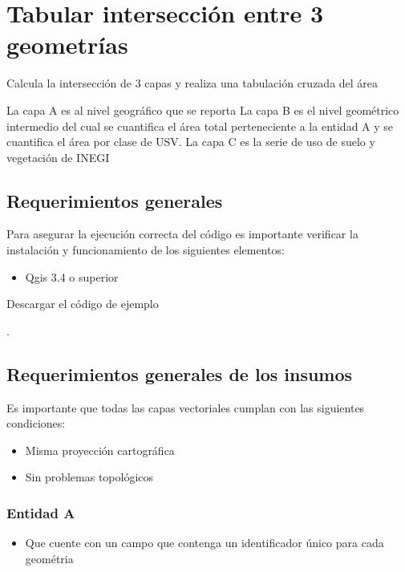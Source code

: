 \documentclass[letterpaper,10pt,spanish]{sphinxmanual}
\begin{document}
\section{Tabular intersección entre 3 geometrías}
\label{\detokenize{tabulacion_3geo:tabular-interseccion-entre-3-geometrias}}\label{\detokenize{tabulacion_3geo::doc}}
Calcula la intersección de 3 capas y realiza una tabulación cruzada del área

La capa A es al nivel geográfico que se reporta
La capa B es el nivel geométrico intermedio del cual se cuantifica
el área total perteneciente a la entidad A y se cuantifica el área  por clase de USV.
La capa C es la serie de uso de suelo y vegetación de INEGI


\subsection{Requerimientos generales}
\label{\detokenize{tabulacion_3geo:requerimientos-generales}}
Para asegurar la ejecución correcta del código es importante
verificar la instalación y funcionamiento de los siguientes elementos:
\begin{itemize}
\item {} 
Qgis 3.4 o superior

\end{itemize}

Descargar el código de ejemplo

.


\subsection{Requerimientos generales de los insumos}
\label{\detokenize{tabulacion_3geo:requerimientos-generales-de-los-insumos}}
Es importante que todas las capas vectoriales cumplan con las siguientes condiciones:
\begin{itemize}
\item {} 
Misma proyección cartográfica

\item {} 
Sin problemas topológicos

\end{itemize}


\subsubsection{Entidad A}
\label{\detokenize{tabulacion_3geo:entidad-a}}\begin{itemize}
\item {} 
Que cuente con un campo que contenga un identificador único para cada geométria

\end{itemize}
\end{document}

